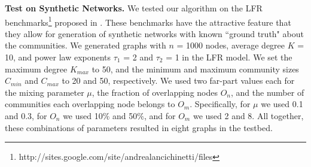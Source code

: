{\bf Test on Synthetic Networks. } We tested our algorithm on the LFR benchmarks\footnote{http://sites.google.com/site/andrealancichinetti/files} proposed in \cite{2008PhRvE..78d6110L}. These benchmarks have the attractive feature that they allow
for generation of synthetic networks with known ``ground truth"  about the communities.
We generated graphs with $n$ = 1000 nodes, average degree $K$ = 10, and power law exponents $\tau_1$ = 2 and $\tau_2$ = 1 in the LFR model. We set the maximum degree $K_{max}$ to 50, and the minimum and maximum community sizes $C_{min}$ and $C_{max}$ to 20 and 50, respectively. We used two far-part values each for the mixing parameter $\mu$, the fraction of overlapping nodes $O_n$, and the number of communities each overlapping node belongs to $O_m$. Specifically, for $\mu$ we used 0.1 and 0.3, for $O_n$ we used 10$\%$ and 50$\%$, and for $O_m$ we used 2 and 8. 
All together, these combinations of parameters resulted in eight graphs in the testbed.



